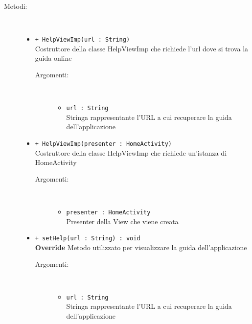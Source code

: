 \documentclass[../DefinizioneDiProdotto.tex]{subfiles}
\begin{document}
\begin{description}
\begin{itemize}
	\end{itemize}
	\item[Metodi:] \
	\begin{itemize}
		\item \texttt{+ HelpViewImp(url : String)}\\
		Costruttore della classe HelpViewImp che richiede l'url dove si trova la guida online
		\begin{description}
			\item[Argomenti:] \
			\begin{itemize}
				\item \texttt{url : String}\\
				Stringa rappresentante l'URL a cui recuperare la guida dell'applicazione\end{itemize}
		\end{description}
		\item \texttt{+ HelpViewImp(presenter : HomeActivity)}\\
		Costruttore della classe HelpViewImp che richiede un'istanza di HomeActivity
		\begin{description}
			\item[Argomenti:] \
			\begin{itemize}
				\item \texttt{presenter : HomeActivity}\\
				Presenter della View che viene creata\end{itemize}
		\end{description}
		\item \texttt{+ setHelp(url : String) : void}\\
		\textbf{Override} Metodo utilizzato per visualizzare la guida dell'applicazione
		\begin{description}
			\item[Argomenti:] \
			\begin{itemize}
				\item \texttt{url : String}\\
				Stringa rappresentante l'URL a cui recuperare la guida dell'applicazione\end{itemize}
		\end{description}
	\end{itemize}
\end{description}
\end{document}
